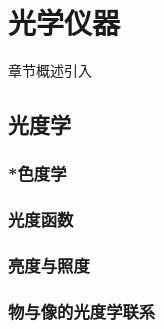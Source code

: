 \chapter{光学仪器}\label{24}

章节概述引入

\section{光度学}\label{24-1}

\subsection{*色度学}\label{24-1-1}

\subsection{光度函数}\label{24-1-2}

\subsection{亮度与照度}\label{24-1-3}

\subsection{物与像的光度学联系}\label{24-1-4}
